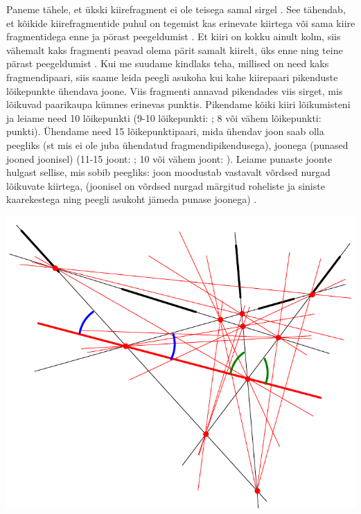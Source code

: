 \solu
Paneme tähele, et ükski kiirefragment ei ole teisega samal sirgel . See tähendab, et kõikide kiirefragmentide puhul on tegemist kas erinevate kiirtega või sama kiire fragmentidega enne ja pörast peegeldumist . Et kiiri on kokku ainult kolm, siis vähemalt kaks fragmenti peavad olema pärit samalt kiirelt, üks enne ning teine pärast peegeldumist . Kui me suudame kindlaks teha, millised on need kaks fragmendipaari, siis saame leida peegli asukoha kui kahe kiirepaari pikenduste lõikepunkte ühendava joone. Viis fragmenti annavad pikendades viis sirget, mis lõikuvad paarikaupa kümnes erinevas punktis. Pikendame kõiki kiiri lõikumisteni ja leiame need 10 lõikepunkti (9-10 lõikepunkti: ; 8 või vähem lõikepunkti:  punkti). Ühendame need 15 lõikepunktipaari, mida ühendav joon saab olla peegliks (st mis ei ole juba ühendatud fragmendipikendusega), joonega (punased jooned joonisel) (11-15 joont: ; 10 või vähem joont: ). Leiame punaste joonte hulgast sellise, mis sobib peegliks: joon moodustab vastavalt võrdsed nurgad lõikuvate kiirtega, (joonisel on võrdsed nurgad märgitud roheliste ja siniste kaarekestega ning peegli asukoht jämeda punase joonega) . 
\begin{center}
\includegraphics[scale=0.7]{2019-v2g-02-yl.pdf}
\end{center}
\probend
